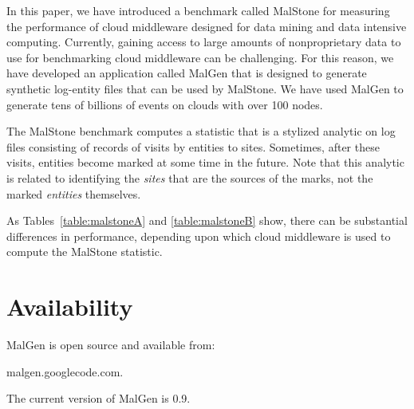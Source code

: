 \documentclass{acm_proc_article-sp}
\def\malstone{MalStone } \def\malgen{MalGen }
\def\malstonens{MalStone} \def\malgenns{MalGen}
\begin{document}
In this paper, we have introduced a benchmark called \malstone for
measuring the performance of cloud middleware designed for data mining
and data intensive computing.  Currently, gaining access to large
amounts of nonproprietary data to use for benchmarking cloud
middleware can be challenging.  For this reason, we have developed an
application called \malgen that is designed to generate synthetic
log-entity files that can be used by \malstonens.  We have used \malgen
to generate tens of billions of events on clouds with over 100 nodes.

The \malstone benchmark computes a statistic that is a stylized analytic on log files consisting of records of visits by entities to sites.  Sometimes, after these visits, entities become marked at some time in the future.  Note that this analytic is related to identifying the {\em sites} that are the sources of the marks, not the marked {\em entities} themselves.

As Tables~\ref{table:malstoneA} and \ref{table:malstoneB} show, there
can be substantial differences in performance, depending upon which
cloud middleware is used to compute the \malstone statistic.


\section{Availability}

\malgen is open source and available from:
\begin{center}
malgen.googlecode.com.
\end{center}
The current version of \malgen is 0.9.
\end{document}
